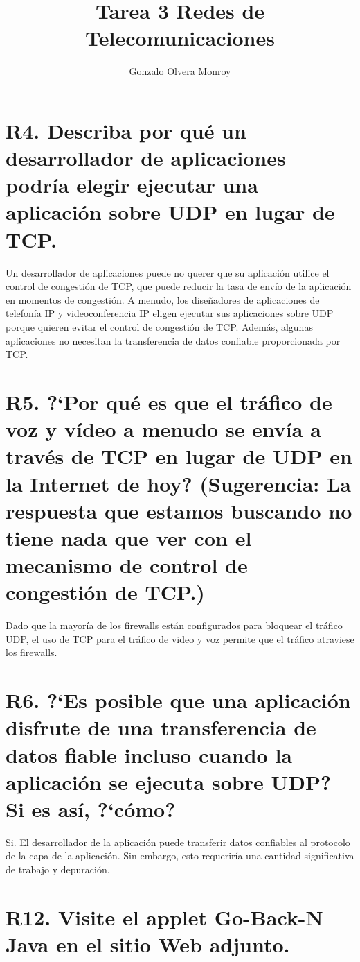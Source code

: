 \documentclass[a4paper, 11pt]{article}
\title{Tarea 3 Redes de Telecomunicaciones}
\author{Gonzalo Olvera Monroy}
\theoremstyle{definition} \theoremstyle{remark}
\begin{document}
    \maketitle
    \section{R4. Describa por qu\'e un desarrollador de aplicaciones podr\'ia elegir ejecutar una aplicaci\'on sobre UDP en lugar de TCP.}
    Un desarrollador de aplicaciones puede no querer que su aplicaci\'on utilice el control de congesti\'on de TCP, que puede reducir la tasa de env\'io de la aplicaci\'on en momentos de congesti\'on. A menudo, los dise\~{n}adores de aplicaciones de telefon\'ia IP y videoconferencia IP eligen ejecutar sus aplicaciones sobre UDP porque quieren evitar el control de congesti\'on de TCP. Adem\'as, algunas aplicaciones no necesitan la transferencia de datos confiable proporcionada por TCP.

    \section{R5. ?`Por qu\'e es que el tr\'afico de voz y v\'ideo a menudo se env\'ia a trav\'es de TCP en lugar de UDP en la Internet de hoy? (Sugerencia: La respuesta que estamos buscando no tiene nada que ver con el mecanismo de control de congesti\'on de TCP.)}
    Dado que la mayor\'ia de los firewalls est\'an configurados para bloquear el tr\'afico UDP, el uso de TCP para el tr\'afico de video y voz permite que el tr\'afico atraviese los firewalls.

    \section{R6. ?`Es posible que una aplicaci\'on disfrute de una transferencia de datos fiable incluso cuando la aplicaci\'on se ejecuta sobre UDP? Si es as\'i, ?`c\'omo?}
    Si. El desarrollador de la aplicaci\'on puede transferir datos confiables al protocolo de la capa de la aplicaci\'on. Sin embargo, esto requerir\'ia una cantidad significativa de trabajo y depuraci\'on.

    \section{R12. Visite el applet Go-Back-N Java en el sitio Web adjunto.}
    \renewcommand{\theenumi}{\alph{enumi}}
\end{document}

